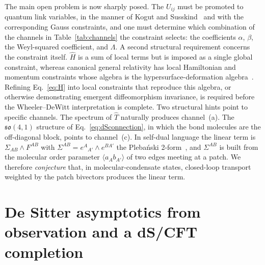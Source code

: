 \documentclass[reprint,aps,prd,amsmath,amssymb,superscriptaddress,nofootinbib,floatfix]{revtex4-2}
\theoremstyle{plain}
\theoremstyle{definition}
\theoremstyle{remark}
\newcommand{\Hc}{\hat{H}}
\newcommand{\Tc}{\hat{T}}
\begin{document}
The main open problem is now sharply posed. The $U_{ij}$ must be promoted to quantum link variables, in the
manner of Kogut and Susskind~\cite{KogutSusskind1975} and with the corresponding Gauss constraints, and one must
determine which combination of the channels in Table~\ref{tab:channels} the constraint selects: the
coefficients $\alpha$, $\beta$, the Weyl-squared coefficient, and $\Lambda$. A second structural requirement concerns the constraint
itself. $\Hc$ is a sum of local terms but is imposed as a single global constraint, whereas canonical general relativity has
local Hamiltonian and momentum constraints whose algebra is the hypersurface-deformation
algebra~\cite{DeWitt1967,HKT1976}. Refining Eq.~\eqref{eq:H} into local constraints that reproduce this algebra, or otherwise
demonstrating emergent diffeomorphism invariance, is required before the Wheeler--DeWitt interpretation is complete. Two structural hints point to specific
channels. The spectrum of $\Tc$ naturally produces channel~(a). The $\mathfrak{so}(4,1)$ structure of
Eq.~\eqref{eq:dSconnection}, in which the bond molecules are the off-diagonal block, points to channel~(c). In
self-dual language the linear term is $\Sigma_{AB}\wedge F^{AB}$ with $\Sigma^{AB}=e^{A}{}_{A'}\wedge e^{BA'}$ the Pleba\'nski
2-form~\cite{Plebanski1977,JacobsonSmolin1988}, and $\Sigma^{AB}$ is built from the molecular order parameter
$\langle a_Ab_{A'}\rangle$ of two edges meeting at a patch. We therefore \emph{conjecture} that, in molecular-condensate
states, closed-loop transport weighted by the patch bivectors produces the linear term.

\section{De Sitter asymptotics from observation and a dS/CFT completion}
\label{sec:dscft}
\end{document}
